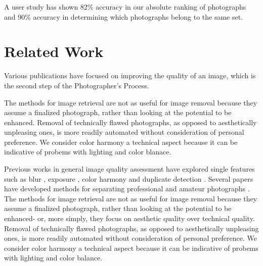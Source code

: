 \documentclass[10pt,twocolumn,letterpaper]{article}
\begin{document}
A user study has shown 82\% accuracy in our absolute ranking of photographs and 90\% accuracy in determining which photographs belong to the same set.

\section{Related Work}
Various publications have focused on improving the quality of an image, which is the second step of the Photographer's Process\cite{Bhattacahrya:2010:FPA:1873951.1873990}\cite{Kopf:2008:DPM:1409060.1409069}. 


The methods for image retrieval are not as useful for image removal because they assume a finalized photograph, rather than looking at the potential to be enhanced. Removal of technically flawed photographs, as opposed to aesthetically unpleasing ones, is more readily automated without consideration of personal preference. We consider color harmony a technical aspect because it can be indicative of probems with lighting and color blanace.

Previous works in general image quality assessment have explored single features such as blur \cite{springerlink:10.1007/978-3-540-77409-9_26}, exposure \cite{5540170}, color harmony \cite{COL:COL5080160410}\cite{COL:COL10004} and duplicate detection \cite{Chu2010256}. %
Several papers have developed methods for separating professional and amateur photographs \cite{springerlink:10.1007/978-3-540-30541-5_25}\cite{springerlink:10.1007/11744078_23}\cite{1640788}\cite{springerlink:10.1007/978-3-540-88690-7_29}. %
The methods for image retrieval are not as useful for image removal because they assume a finalized photograph, rather than looking at the potential to be enhanced- or, more simply, they focus on aesthetic quality over technical quality. Removal of technically flawed photographs, as opposed to aesthetically unpleasing ones, is more readily automated without consideration of personal preference. We consider color harmony a technical aspect because it can be indicative of probems with lighting and color balance.
\end{document}
